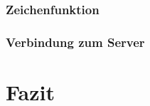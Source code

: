 \documentclass[toc=bib,toc=listof, 12pt]{scrreprt}
\begin{document}
		\subsection{Zeichenfunktion}
			
		\subsection{Verbindung zum Server}
			
			
	\pagebreak
\newpage
\clearpage
\thispagestyle{empty}

\chapter{Fazit} %
\label{sec:fazit}
\setcounter{page}{48}


\setcounter{page}{2}
\label{sec:abkuerzungsverzeichnis}
\begin{description}  
   
\end{description}

\listoffigures

\listoftables
\lstlistoflistings
\begin{appendix}


\end{appendix}
\end{document}
